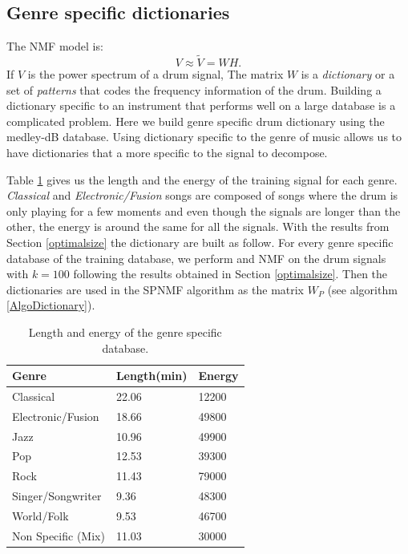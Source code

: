 \documentclass{article}
\begin{document}
\subsection{Genre specific dictionaries}\label{genrespecdict}

The NMF model is:
\begin{equation}
V \approx \tilde{V} = WH.
\end{equation}
If $V$ is the power spectrum of a drum signal, The matrix $W$ is a {\em dictionary} or a set of {\em patterns} that codes the frequency information of the drum. Building a dictionary specific to an instrument that performs well on a large database is a complicated problem. Here we build genre specific drum dictionary using the medley-dB database. Using dictionary specific to the genre of music allows us to have dictionaries that a more specific to the signal to decompose.

Table \ref{lengthDict} gives us the length and the energy of the training signal for each genre. \emph{Classical} and \emph{Electronic/Fusion} songs are composed of songs where the drum is only playing for a few moments and even though the signals are longer than the other, the energy is around the same for all the signals. With the results from Section \ref{optimalsize} the dictionary are built as follow. For every genre specific database of the training database, we perform and NMF on the drum signals with $k=100$ following the results obtained in Section \ref{optimalsize}. Then the dictionaries are used in the SPNMF algorithm as the matrix $W_P$ (see algorithm \ref{AlgoDictionary}).

\begin{table}
   
	\centering 
   \begin{tabular}{|l|l|l|}
\hline   
Genre & Length(min) & Energy\\
\hline
Classical  & 22.06 & 12200 \\
\hline
Electronic/Fusion & 18.66 & 49800\\
\hline
Jazz & 10.96 & 49900\\
\hline
Pop &  12.53 & 39300\\
\hline
Rock & 11.43& 79000\\
\hline
Singer/Songwriter & 9.36 & 48300\\
\hline
World/Folk & 9.53 & 46700\\
\hline
Non Specific (Mix) & 11.03 & 30000 \\
\hline
  
\end{tabular} 
\caption{\label{lengthDict} Length and energy of the genre specific database.}
\end{table}
\end{document}
